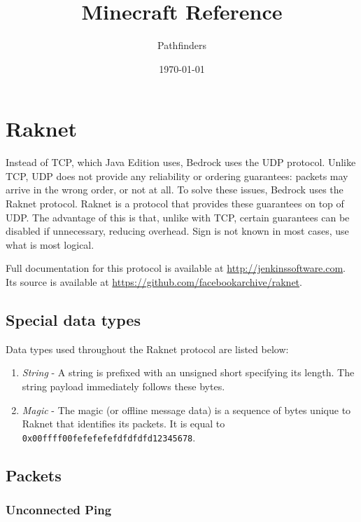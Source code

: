 \documentclass[12pt]{report}
\title{Minecraft Reference}
\author{Pathfinders}
\date{\today}
\begin{document}
\maketitle
\tableofcontents    

\chapter{Raknet}\label{chap:raknet}

Instead of TCP, which Java Edition uses, Bedrock uses the UDP protocol.
Unlike TCP, UDP does not provide any reliability or ordering guarantees:
packets may arrive in the wrong order, or not at all. 
To solve these issues, Bedrock uses the Raknet protocol. 
Raknet is a protocol that provides these guarantees on top of UDP.
The advantage of this is that, unlike with TCP, certain guarantees can be disabled if unnecessary,
reducing overhead. Sign is not known in most cases, use what is most logical.

Full documentation for this protocol is available at \url{http://jenkinssoftware.com}.
Its source is available at \url{https://github.com/facebookarchive/raknet}.

\section{Special data types}\label{sec:raknet-types}

Data types used throughout the Raknet protocol are listed below:
\begin{enumerate}
    \item \textit{String} - A string is prefixed with an unsigned short specifying its length.
    The string payload immediately follows these bytes.

    \item \textit{Magic} - The magic (or offline message data) is a sequence of bytes unique to Raknet that identifies its packets.
    It is equal to \\
    \texttt{0x00ffff00fefefefefdfdfdfd12345678}.
\end{enumerate}

\section{Packets}\label{sec:raknet-packets}

\subsection{Unconnected Ping}\label{subsec:unconnected-ping}
\end{document}
